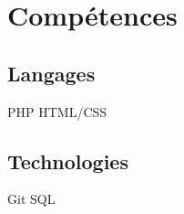 \documentclass[]{deedy-resume-openfont}
\begin{document}
\begin{minipage}[t]{0.33\textwidth}


\section{Compétences}
\subsection{Langages}
PHP \textbullet{} HTML/CSS \\

\subsection{Technologies}
Git \textbullet{}  SQL \\ 




\end{minipage}
\end{document}
